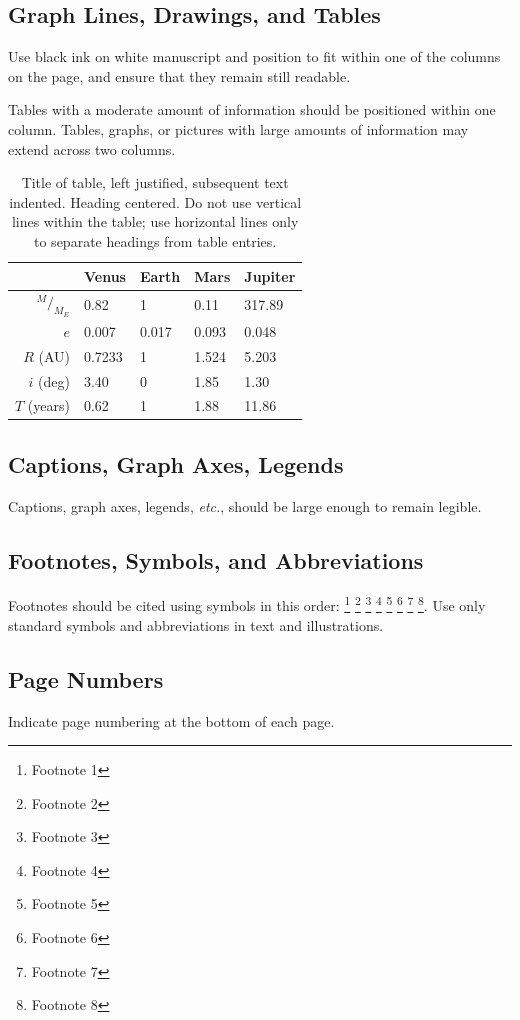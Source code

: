 \documentclass[fleqn]{iac}
\newcommand*\rfrac[2]{{{}^{#1}\!/_{#2}}} %
\begin{document}
\subsection{Graph Lines, Drawings, and Tables}
Use black ink on white manuscript and position to fit within one of the columns on the page, and ensure that they remain still readable.

Tables with a moderate amount of information should be positioned within one column. Tables, graphs, or pictures with large amounts of information may extend across two columns.

\begin{table}
\begin{tabular}{rllll}
\toprule
& Venus & Earth & Mars & Jupiter \\
\midrule
$\rfrac{M}{M_E}$	& 0.82 		& 1 		& 0.11 		& 317.89	\\
$e$					& 0.007		& 0.017		& 0.093		& 0.048		\\
$R$ (AU)			& 0.7233	& 1			& 1.524		& 5.203		\\
$i$ (deg)			& 3.40		& 0			& 1.85		& 1.30		\\
$T$ (years)			& 0.62		& 1			& 1.88		& 11.86		\\
\bottomrule
\end{tabular}
\caption{\label{table:X}Title of table, left justified, subsequent text indented. Heading centered. Do not use vertical lines within the table; use horizontal lines only to separate headings from table entries.}
\end{table}

\subsection{Captions, Graph Axes, Legends}
Captions, graph axes, legends, \textit{etc.}, should be large enough to remain legible.

\subsection{Footnotes, Symbols, and Abbreviations}
Footnotes should be cited using symbols in this order: \footnote{Footnote 1} \footnote{Footnote 2} \footnote{Footnote 3} \footnote{Footnote 4} \footnote{Footnote 5} \footnote{Footnote 6} \footnote{Footnote 7} \footnote{Footnote 8}. Use only standard symbols and abbreviations in text and illustrations.

\subsection{Page Numbers}
Indicate page numbering at the bottom of each page.



\end{document}
